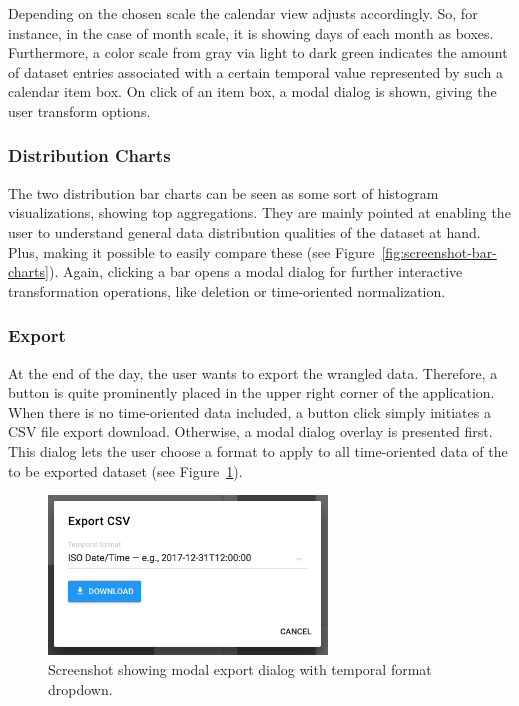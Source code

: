 Depending on the chosen scale the calendar view adjusts accordingly.
So, for instance, in the case of month scale, it is showing days of each month as boxes.
Furthermore, a color scale from gray via light to dark green indicates the amount of dataset entries associated with a certain temporal value represented by such a calendar item box.
On click of an item box, a modal dialog is shown, giving the user transform options.

\subsubsection{Distribution Charts}

The two distribution bar charts can be seen as some sort of histogram visualizations, showing top aggregations.
They are mainly pointed at enabling the user to understand general data distribution qualities of the dataset at hand.
Plus, making it possible to easily compare these (see Figure~\ref{fig:screenshot-bar-charts}).
Again, clicking a bar opens a modal dialog for further interactive transformation operations, like deletion or time-oriented normalization.

\subsubsection{Export}

At the end of the day, the user wants to export the wrangled data.
Therefore, a button is quite prominently placed in the upper right corner of the application.
When there is no time-oriented data included, a button click simply initiates a \textsc{CSV} file export download.
Otherwise, a modal dialog overlay is presented first.
This dialog lets the user choose a format to apply to all time-oriented data of the to be exported dataset (see Figure~\ref{fig:screenshot-export-dialog}).

\begin{figure}[h]
  \centering
  \includegraphics[width=0.66\textwidth]{figures/implementation/screenshot-export-dialog}
  \caption{Screenshot showing modal export dialog with temporal format dropdown.}
  \label{fig:screenshot-export-dialog}
\end{figure}


